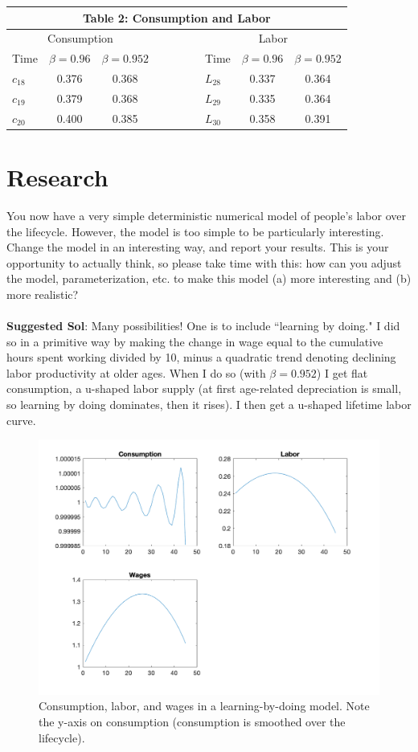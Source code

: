 \documentclass[11pt]{article}
\begin{document}
\begin{table}[ht!]
\centering
\begin{tabular}{lcclllcc}
\multicolumn{8}{c}{Table 2: Consumption  and Labor}\\
\hline\hline
\multicolumn{3}{c}{Consumption  } & & &  \multicolumn{3}{c}{Labor}\\
Time & $\beta=0.96$ & $\beta=0.952$ & \ \  & \ \ & Time & $\beta=0.96$ & $\beta=0.952$\\
\cline{1-3}  \cline{6-8}
 $c_{18}$ & 0.376 & 0.368  & & &  $L_{28}$ & 0.337  & 0.364\\
$c_{19}$ & 0.379& 0.368  & & & $L_{29}$ & 0.335 & 0.364\\
$c_{20}$ & 0.400 & 0.385  & & &  $L_{30}$ & 0.358 & 0.391\\
\hline\hline
\end{tabular}
\end{table}



\clearpage
\section{Research}
You now have a very simple deterministic numerical model of people's labor over the lifecycle.  However, the model is too simple to be particularly interesting.  Change the model in an interesting way, and report your results.  This is your opportunity to actually think, so please take time with this:  how can you adjust the model, parameterization, etc. to make this model (a) more interesting and (b) more realistic?\\
\ \\
\textbf{Suggested Sol}: Many possibilities!  One is to include ``learning by doing."  I did so in a primitive way by making the change in wage equal to the cumulative hours spent working divided by 10, minus a quadratic trend denoting declining labor productivity at older ages.  When I do so (with $\beta=0.952$) I get flat consumption, a u-shaped labor supply (at first age-related depreciation is small, so learning by doing dominates, then it rises).  I then get a u-shaped lifetime labor curve.

\begin{figure}[ht!]
\centering
\includegraphics[scale=0.5]{Figure2.png}
\caption{Consumption, labor, and wages in a learning-by-doing model.  Note the y-axis on consumption (consumption is smoothed over the lifecycle).}
\end{figure}
\end{document}
